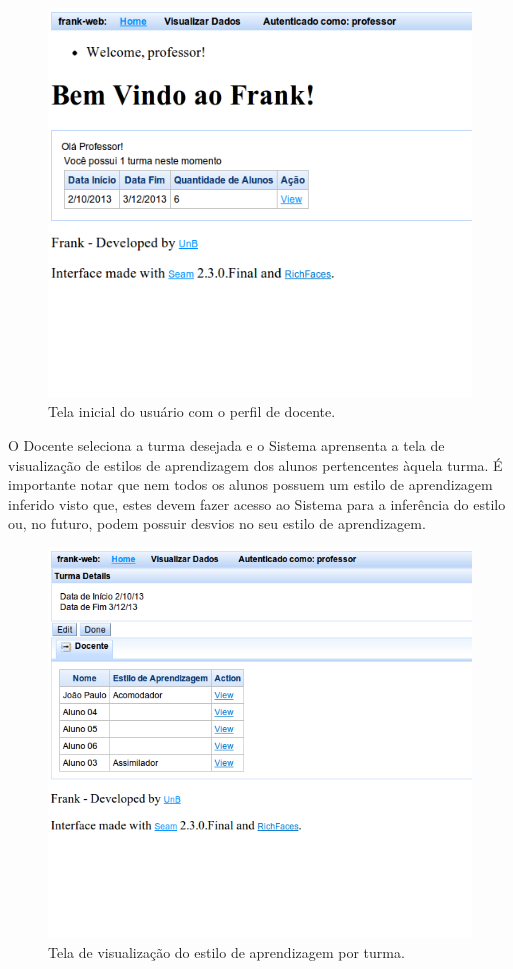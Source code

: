 \begin{figure}
	\centering
	\includegraphics[scale=0.48]{images/frank-tela-professor-acesso.png}
	\caption{Tela inicial do usuário com o perfil de docente.}
	\label{fig:frank-tela-professor-acesso}
\end{figure}

O Docente seleciona a turma desejada e o Sistema aprensenta a tela de visualização de estilos de aprendizagem dos alunos pertencentes àquela turma. É importante notar que nem todos os alunos possuem um estilo de aprendizagem inferido visto que, estes devem fazer acesso ao Sistema para a inferência do estilo ou, no futuro, podem possuir desvios no seu estilo de aprendizagem.

\begin{figure}
	\centering
	\includegraphics[scale=0.48]{images/frank-tela-professor-visualizar-turma.png}
	\caption{Tela de visualização do estilo de aprendizagem por turma.}
	\label{fig:frank-tela-professor-visualizar-turma}
\end{figure}
